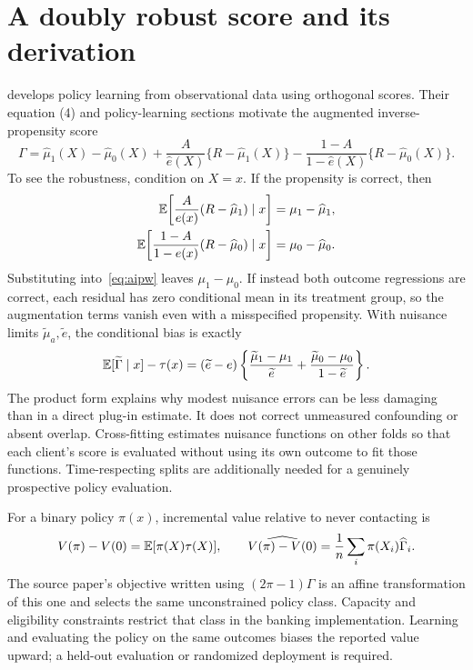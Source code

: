 \section{A doubly robust score and its derivation}
\citet{wager2021policy} develops policy learning from observational data using orthogonal scores. Their equation (4) and policy-learning sections motivate the augmented inverse-propensity score
\begin{equation}
\Gamma=\widehat\mu_1(X)-\widehat\mu_0(X)
+\frac{A}{\widehat e(X)}\{R-\widehat\mu_1(X)\}
-\frac{1-A}{1-\widehat e(X)}\{R-\widehat\mu_0(X)\}.
\label{eq:aipw}
\end{equation}
To see the robustness, condition on $X=x$. If the propensity is correct, then
\begin{align}
\mathbb E\!\left[\frac A{e(x)}(R-\widehat\mu_1)\mid x\right]
&=\mu_1-\widehat\mu_1,\\
\mathbb E\!\left[\frac{1-A}{1-e(x)}(R-\widehat\mu_0)\mid x\right]
&=\mu_0-\widehat\mu_0.
\end{align}
Substituting into~\eqref{eq:aipw} leaves $\mu_1-\mu_0$. If instead both outcome regressions are correct, each residual has zero conditional mean in its treatment group, so the augmentation terms vanish even with a misspecified propensity. With nuisance limits $\widetilde\mu_a,\widetilde e$, the conditional bias is exactly
\begin{equation}
\mathbb E[\widetilde\Gamma\mid x]-\tau(x)
=(\widetilde e-e)
\left\{\frac{\widetilde\mu_1-\mu_1}{\widetilde e}
+\frac{\widetilde\mu_0-\mu_0}{1-\widetilde e}\right\}.
\end{equation}
The product form explains why modest nuisance errors can be less damaging than in a direct plug-in estimate. It does not correct unmeasured confounding or absent overlap. Cross-fitting estimates nuisance functions on other folds so that each client's score is evaluated without using its own outcome to fit those functions. Time-respecting splits are additionally needed for a genuinely prospective policy evaluation.

For a binary policy $\pi(x)$, incremental value relative to never contacting is
\begin{equation}
V(\pi)-V(0)=\mathbb E[\pi(X)\tau(X)],
\qquad
\widehat{V(\pi)-V(0)}=\frac1n\sum_i\pi(X_i)\widehat\Gamma_i.
\end{equation}
The source paper's objective written using $(2\pi-1)\Gamma$ is an affine transformation of this one and selects the same unconstrained policy class. Capacity and eligibility constraints restrict that class in the banking implementation. Learning and evaluating the policy on the same outcomes biases the reported value upward; a held-out evaluation or randomized deployment is required.

